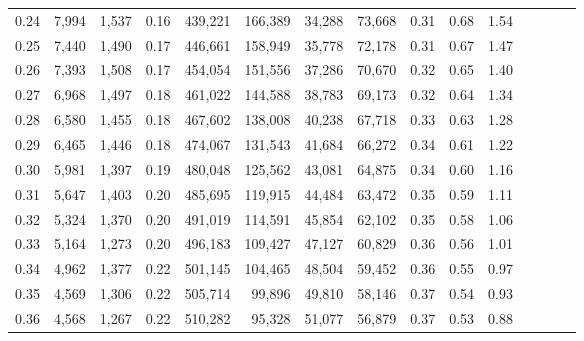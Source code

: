 \begin{tabular}{rrrcrrrrrrrrrrr}
0.24 &   7,994 &   1,537 &                                       0.16 &  439,221 &  166,389 &   34,288 &   73,668 &  0.31 &  0.68 &                         1.54 \\
0.25 &   7,440 &   1,490 &                                       0.17 &  446,661 &  158,949 &   35,778 &   72,178 &  0.31 &  0.67 &                         1.47 \\
0.26 &   7,393 &   1,508 &                                       0.17 &  454,054 &  151,556 &   37,286 &   70,670 &  0.32 &  0.65 &                         1.40 \\
0.27 &   6,968 &   1,497 &                                       0.18 &  461,022 &  144,588 &   38,783 &   69,173 &  0.32 &  0.64 &                         1.34 \\
0.28 &   6,580 &   1,455 &                                       0.18 &  467,602 &  138,008 &   40,238 &   67,718 &  0.33 &  0.63 &                         1.28 \\
0.29 &   6,465 &   1,446 &                                       0.18 &  474,067 &  131,543 &   41,684 &   66,272 &  0.34 &  0.61 &                         1.22 \\
0.30 &   5,981 &   1,397 &                                       0.19 &  480,048 &  125,562 &   43,081 &   64,875 &  0.34 &  0.60 &                         1.16 \\
0.31 &   5,647 &   1,403 &                                       0.20 &  485,695 &  119,915 &   44,484 &   63,472 &  0.35 &  0.59 &                         1.11 \\
0.32 &   5,324 &   1,370 &                                       0.20 &  491,019 &  114,591 &   45,854 &   62,102 &  0.35 &  0.58 &                         1.06 \\
0.33 &   5,164 &   1,273 &                                       0.20 &  496,183 &  109,427 &   47,127 &   60,829 &  0.36 &  0.56 &                         1.01 \\
0.34 &   4,962 &   1,377 &                                       0.22 &  501,145 &  104,465 &   48,504 &   59,452 &  0.36 &  0.55 &                         0.97 \\
0.35 &   4,569 &   1,306 &                                       0.22 &  505,714 &   99,896 &   49,810 &   58,146 &  0.37 &  0.54 &                         0.93 \\
0.36 &   4,568 &   1,267 &                                       0.22 &  510,282 &   95,328 &   51,077 &   56,879 &  0.37 &  0.53 &                         0.88 \\

\end{tabular}
